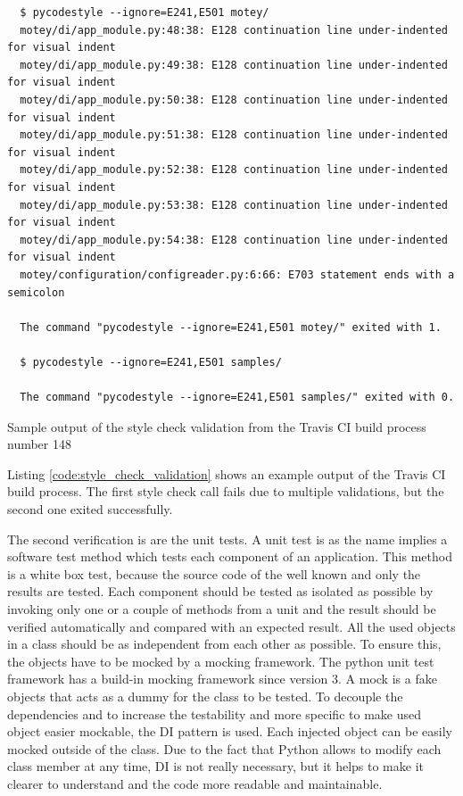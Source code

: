 \begin{listing}[H]
  \begin{verbatim}
  $ pycodestyle --ignore=E241,E501 motey/
  motey/di/app_module.py:48:38: E128 continuation line under-indented for visual indent
  motey/di/app_module.py:49:38: E128 continuation line under-indented for visual indent
  motey/di/app_module.py:50:38: E128 continuation line under-indented for visual indent
  motey/di/app_module.py:51:38: E128 continuation line under-indented for visual indent
  motey/di/app_module.py:52:38: E128 continuation line under-indented for visual indent
  motey/di/app_module.py:53:38: E128 continuation line under-indented for visual indent
  motey/di/app_module.py:54:38: E128 continuation line under-indented for visual indent
  motey/configuration/configreader.py:6:66: E703 statement ends with a semicolon

  The command "pycodestyle --ignore=E241,E501 motey/" exited with 1.

  $ pycodestyle --ignore=E241,E501 samples/

  The command "pycodestyle --ignore=E241,E501 samples/" exited with 0.
  \end{verbatim}
  \caption[Sample output of the style check validation from the Travis \ac{CI} build process number 148]{Sample output of the style check validation from the Travis \ac{CI} build process number 148\autocite{Travis:Build:148}}
  \label{code:style_check_validation}
\end{listing}

Listing \ref{code:style_check_validation} shows an example output of the Travis \ac{CI} build process.
The first style check call fails due to multiple validations, but the second one exited successfully.\newline

The second verification is are the unit tests.
A unit test is as the name implies a software test method which tests each component of an application.
This method is a white box test, because the source code of the well known and only the results are tested.
Each component should be tested as isolated as possible by invoking only one or a couple of methods from a unit and the result should be verified automatically and compared with an expected result.\autocite[cf.][p. 320]{Olan:2003:UTT}
All the used objects in a class should be as independent from each other as possible.
To ensure this, the objects have to be mocked by a mocking framework.
The python unit test framework has a build-in mocking framework since version 3.
A mock is a fake objects that acts as a dummy for the class to be tested.
To decouple the dependencies and to increase the testability and more specific to make used object easier mockable, the \ac{DI} pattern is used.
Each injected object can be easily mocked outside of the class.
Due to the fact that Python allows to modify each class member at any time, \ac{DI} is not really necessary, but it helps to make it clearer to understand and the code more readable and maintainable.\newline

